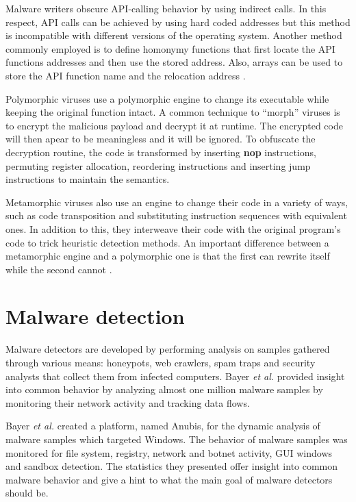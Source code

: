 Malware writers obscure API-calling behavior by using indirect calls. In this respect, API calls can be achieved by using hard coded addresses but this method is incompatible with different versions of the operating system. Another method commonly employed is to define homonymy functions that first locate the API functions addresses and then use the stored address. Also, arrays can be used to store the API function name and the relocation address \cite{static-detection-behavior}.

Polymorphic viruses use a polymorphic engine to change its executable while keeping the original function intact. A common technique to ``morph'' viruses is to encrypt the malicious payload and decrypt it at runtime. The encrypted code will then apear to be meaningless and it will be ignored. To obfuscate the decryption routine, the code is transformed by inserting \textbf{nop} instructions, permuting register allocation, reordering instructions and inserting jump instructions to maintain the semantics.

Metamorphic viruses also use an engine to change their code in a variety of ways, such as code transposition and substituting instruction sequences with equivalent ones. In addition to this, they interweave their code with the original program's code to trick heuristic detection methods. An important difference between a metamorphic engine and a polymorphic one is that the first can rewrite itself while the second cannot \cite{testing-mal-det}.

\section{Malware detection}
\label{sec:mal-detection}

Malware detectors are developed by performing analysis on samples gathered through various means: honeypots, web crawlers, spam traps and security analysts that collect them from infected computers. Bayer \textit{et al.} \cite{current-mal-behavior} provided insight into common behavior by analyzing almost one million malware samples by monitoring their network activity and tracking data flows.

Bayer \textit{et al.} created a platform, named Anubis, for the dynamic analysis of malware samples which targeted Windows. The behavior of malware samples was monitored for file system, registry, network and botnet activity, GUI windows and sandbox detection. The statistics they presented offer insight into common malware behavior and give a hint to what the main goal of malware detectors should be.

